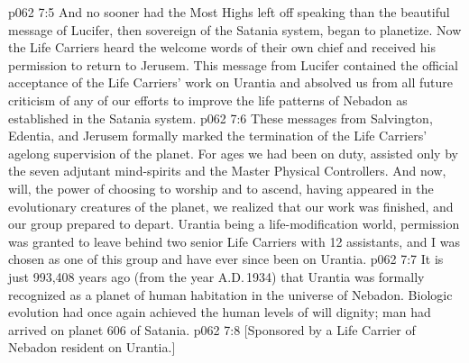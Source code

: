 \vs p062 7:5 And no sooner had the Most Highs left off speaking than the beautiful message of Lucifer, then sovereign of the Satania system, began to planetize. Now the Life Carriers heard the welcome words of their own chief and received his permission to return to Jerusem. This message from Lucifer contained the official acceptance of the Life Carriers’ work on Urantia and absolved us from all future criticism of any of our efforts to improve the life patterns of Nebadon as established in the Satania system.
\vs p062 7:6 These messages from Salvington, Edentia, and Jerusem formally marked the termination of the Life Carriers’ agelong supervision of the planet. For ages we had been on duty, assisted only by the seven adjutant mind\hyp{}spirits and the Master Physical Controllers. And now, will, the power of choosing to worship and to ascend, having appeared in the evolutionary creatures of the planet, we realized that our work was finished, and our group prepared to depart. Urantia being a life\hyp{}modification world, permission was granted to leave behind two senior Life Carriers with 12 assistants, and I was chosen as one of this group and have ever since been on Urantia.
\vs p062 7:7 It is just 993,408 years ago (from the year A.D.\,1934) that Urantia was formally recognized as a planet of human habitation in the universe of Nebadon. Biologic evolution had once again achieved the human levels of will dignity; man had arrived on planet 606 of Satania.
\vsetoff
\vs p062 7:8 [Sponsored by a Life Carrier of Nebadon resident on Urantia.]
\quizlink
